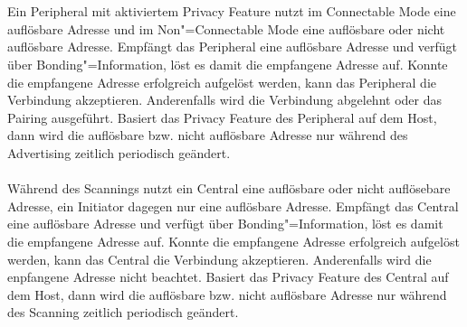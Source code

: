 \\\\
Ein Peripheral mit aktiviertem Privacy Feature nutzt im Connectable Mode eine auflösbare Adresse und im Non"=Connectable Mode eine auflösbare oder nicht auflösbare Adresse. Empfängt das Peripheral eine auflösbare Adresse und verfügt über Bonding"=Information, löst es damit die empfangene Adresse auf. Konnte die empfangene Adresse erfolgreich aufgelöst werden, kann das Peripheral die Verbindung akzeptieren. Anderenfalls wird die Verbindung abgelehnt oder das Pairing ausgeführt. Basiert das Privacy Feature des Peripheral auf dem Host, dann wird die auflösbare bzw. nicht auflösbare Adresse nur während des Advertising zeitlich periodisch geändert. \cite{BtSpec4.2_2077}
\\\\
Während des Scannings nutzt ein Central eine auflösbare oder nicht auflösebare Adresse, ein Initiator dagegen nur eine auflösbare Adresse. Empfängt das Central eine auflösbare Adresse und verfügt über Bonding"=Information, löst es damit die empfangene Adresse auf. Konnte die empfangene Adresse erfolgreich aufgelöst werden, kann das Central die Verbindung akzeptieren. Anderenfalls wird die enpfangene Adresse nicht beachtet. Basiert das Privacy Feature des Central auf dem Host, dann wird die auflösbare bzw. nicht auflösbare Adresse nur während des Scanning zeitlich periodisch geändert. \cite{BtSpec4.2_2078}
